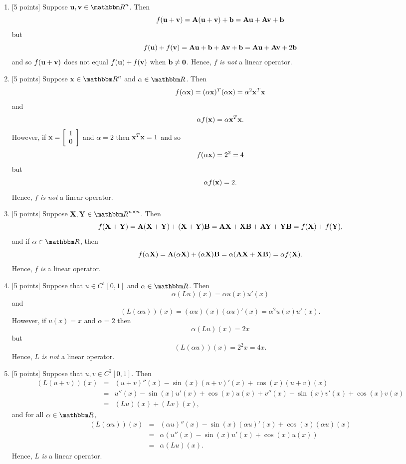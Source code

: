 \begin{solution}
\begin{enumerate}
\item {[5 points]} Suppose $\Bu, \Bv \in \Rn$.  Then 
\[
f({\bf u}+{\bf v}) = {\bf A}({\bf u}+{\bf v}) + {\bf b}  = {\bf A}{\bf u} + {\bf A}{\bf v} + {\bf b}
\]
but
\[
f({\bf u})+f({\bf v}) = {\bf A}{\bf u} + {\bf b} + {\bf A}{\bf v} + {\bf b} = {\bf A}{\bf u} + {\bf A}{\bf v} + 2{\bf b}
\]
and so $f({\bf u}+{\bf v})$ does not equal $f({\bf u}) + f({\bf v})$ when ${\bf b}\ne {\bf 0}$. Hence, $f$ \emph{is not} a linear operator.
\\
\item {[5 points]} Suppose $\Bx\in \Rn$ and $\alpha\in\R$. Then 
\[
f(\alpha{\bf x}) = (\alpha {\bf x})^T(\alpha {\bf x}) = \alpha^2 {\bf x}^T{\bf x}
\]
and 
\[
\alpha f({\bf x}) = \alpha {\bf x}^T{\bf x}.
\]
However, if $\displaystyle{{\bf x}= \left[\begin{array}{c}1\\ 0\end{array}\right]}$ and $\alpha=2$ then ${\bf x}^T{\bf x}=1$ and so
\[
f(\alpha{\bf x}) = 2^2=4
\]
but
\[
\alpha f({\bf x}) = 2.
\]
Hence, $f$ \emph{is not} a linear operator.
\\
\item {[5 points]} Suppose $\BX, \BY \in \Rnn$. Then 
\[
f({\bf X}+{\bf Y}) = {\bf A}({\bf X}+{\bf Y}) + ({\bf X}+{\bf Y}){\bf B} = {\bf A}{\bf X} + {\bf X} {\bf B} + {\bf A}{\bf Y} + {\bf Y}{\bf B} = f({\bf X}) + f({\bf Y}),
\]
and if $\alpha\in\R$, then
\[
f(\alpha {\bf X}) = {\bf A}(\alpha{\bf X}) + (\alpha {\bf X}) {\bf B} = \alpha ({\bf A}{\bf X} + {\bf X}{\bf B}) = \alpha f({\bf X}).
\]
Hence, $f$ \emph{is} a linear operator.
\\
\item {[5 points]} Suppose that $u \in C^1[0,1]$ and $\alpha \in \R$. Then 
\[
\alpha(Lu)(x) = \alpha u(x) u'(x)
\]
and
\[
(L(\alpha u))(x) = (\alpha u)(x) (\alpha u)'(x)=\alpha^2u(x) u'(x).
\]
However, if $u(x) = x$ and $\alpha=2$ then
\[
\alpha(Lu)(x) = 2x
\]
but
\[
(L(\alpha u))(x) = 2^2 x=4x.
\]
Hence, $L$ \emph{is not} a linear operator.
\\
\item {[5 points]} Suppose that $u, v \in C^2[0,1]$. Then 
\begin{eqnarray*}
(L(u+v))(x) &=& (u+v)''(x) - \sin(x) (u+v)'(x) + \cos(x) (u+v)(x)
\\
&=& u''(x) - \sin(x) u'(x) + \cos(x) u(x) + v''(x) - \sin(x) v'(x) + \cos(x) v(x)
\\
&=& (Lu)(x) + (Lv)(x),
\end{eqnarray*}
and for all $\alpha \in \R$,
\begin{eqnarray*}
(L(\alpha u))(x) &=& (\alpha u)''(x) - \sin(x) (\alpha u)'(x) + \cos(x) (\alpha u)(x)
\\
&=& \alpha \left(u''(x) - \sin(x) u'(x) + \cos(x) u(x)\right)
\\
&=& \alpha (Lu)(x).
\end{eqnarray*}
Hence, $L$ \emph{is} a linear operator.
\end{enumerate}
\end{solution}
